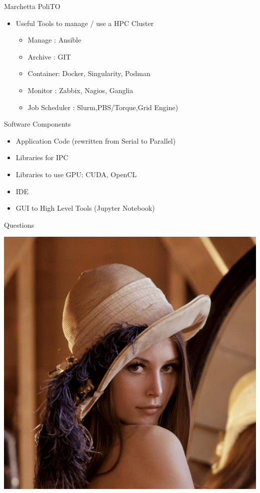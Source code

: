 \documentclass[ignorenonframetext,]{beamer}
\providecommand{\tightlist}{%
  \setlength{\itemsep}{0pt}\setlength{\parskip}{0pt}}
\begin{document}
\begin{frame}{Marchetta PoliTO}

\begin{itemize}
\tightlist
\item
  Useful Tools to manage / use a HPC Cluster

  \begin{itemize}
  \tightlist
  \item
    Manage : Ansible
  \item
    Archive : GIT
  \item
    Container: Docker, Singularity, Podman
  \item
    Monitor : Zabbix, Nagios, Ganglia
  \item
    Job Scheduler : Slurm,PBS/Torque,Grid Engine)
  \end{itemize}

\end{itemize}


\end{frame}

\begin{frame}{Software Components}

\begin{itemize}
\tightlist
\item
  Application Code (rewritten from Serial to Parallel)
\item
  Libraries for IPC
\item
  Libraries to use GPU: CUDA, OpenCL
\item
  IDE
\item
  GUI to High Level Tools (Jupyter Notebook)
\end{itemize}


\end{frame}

\begin{frame}{Questions}

\includegraphics{images/Lenna-Q1.png}

\end{frame}
\end{document}
